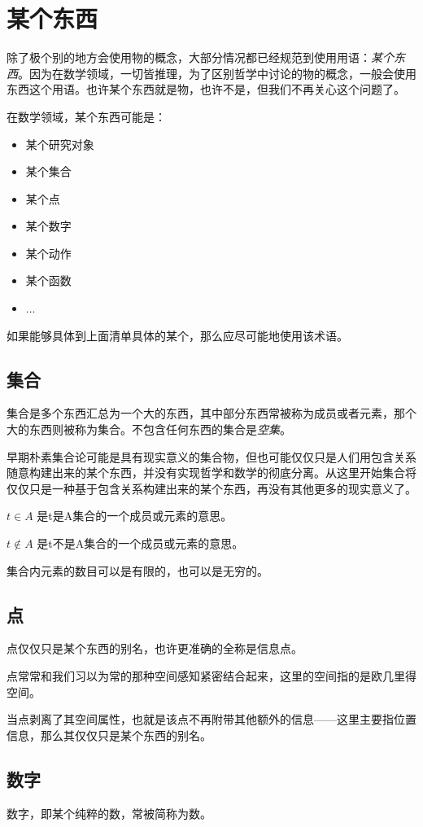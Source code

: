 \documentclass[12pt,oneside]{book}
\begin{document}
\section{某个东西}
除了极个别的地方会使用物的概念，大部分情况都已经规范到使用用语：\emph{某个东西}。因为在数学领域，一切皆推理，为了区别哲学中讨论的物的概念，一般会使用东西这个用语。也许某个东西就是物，也许不是，但我们不再关心这个问题了。

在数学领域，某个东西可能是：

\begin{itemize}
\item 某个研究对象
\item 某个集合
\item 某个点
\item 某个数字
\item 某个动作
\item 某个函数
\item ...
\end{itemize}

如果能够具体到上面清单具体的某个，那么应尽可能地使用该术语。

\subsection{集合}
集合是多个东西汇总为一个大的东西，其中部分东西常被称为成员或者元素，那个大的东西则被称为集合。不包含任何东西的集合是\textit{空集}。

早期朴素集合论可能是具有现实意义的集合物，但也可能仅仅只是人们用包含关系随意构建出来的某个东西，并没有实现哲学和数学的彻底分离。从这里开始集合将仅仅只是一种基于包含关系构建出来的某个东西，再没有其他更多的现实意义了。

$t \in A$ 是t是A集合的一个成员或元素的意思。

$t \notin A$ 是t不是A集合的一个成员或元素的意思。

集合内元素的数目可以是有限的，也可以是无穷的。


\subsection{点}
点仅仅只是某个东西的别名，也许更准确的全称是信息点。

点常常和我们习以为常的那种空间感知紧密结合起来，这里的空间指的是欧几里得空间。

当点剥离了其空间属性，也就是该点不再附带其他额外的信息——这里主要指位置信息，那么其仅仅只是某个东西的别名。

\subsection{数字}
数字，即某个纯粹的数，常被简称为数。
\end{document}

